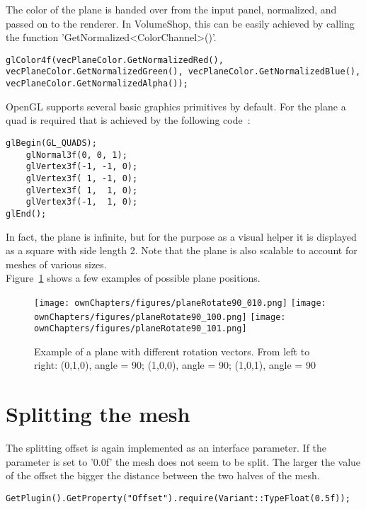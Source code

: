The color of the plane is handed over from the input panel, normalized, and passed on to the renderer. In VolumeShop, this can be easily achieved by calling the function 'GetNormalized<ColorChannel>()'.
\begin{lstlisting}
glColor4f(vecPlaneColor.GetNormalizedRed(), vecPlaneColor.GetNormalizedGreen(), vecPlaneColor.GetNormalizedBlue(), vecPlaneColor.GetNormalizedAlpha());
\end{lstlisting}

OpenGL supports several basic graphics primitives by default. For the plane a quad is required that is achieved by the following code~\cite{book:computerGraphicsHill}: %
\begin{lstlisting}
glBegin(GL_QUADS);
	glNormal3f(0, 0, 1);
	glVertex3f(-1, -1, 0);
	glVertex3f( 1, -1, 0);
	glVertex3f( 1,  1, 0);
	glVertex3f(-1,  1, 0);
glEnd();
\end{lstlisting}

In fact, the plane is infinite, but for the purpose as a visual helper it is displayed as a square with side length 2. Note that the plane is also scalable to account for meshes of various sizes.\\

Figure~\ref{fig:plane} shows a few examples of possible plane positions.
\begin{figure}%
\centering
\texttt{[image: ownChapters/figures/planeRotate90\_010.png]}%
\hspace{5.00mm}
\texttt{[image: ownChapters/figures/planeRotate90\_100.png]}%
\hspace{5.00mm}
\texttt{[image: ownChapters/figures/planeRotate90\_101.png]}%
\caption{Example of a plane with different rotation vectors. From left to right: (0,1,0), angle = 90; (1,0,0), angle = 90; (1,0,1), angle = 90}%
\label{fig:plane}%
\end{figure}

\section{Splitting the mesh}

The splitting offset is again implemented as an interface parameter. If the parameter is set to '0.0f' the mesh does not seem to be split. The larger the value of the offset the bigger the distance between the two halves of the mesh.
\begin{lstlisting}
GetPlugin().GetProperty("Offset").require(Variant::TypeFloat(0.5f));
\end{lstlisting}

